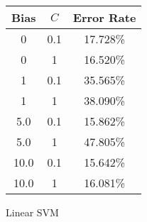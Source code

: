 \begin{center}
\begin{tabular}{|c|c|c|}
\hline
Bias & $C$ & Error Rate \\
\hline
0 & 0.1 & 17.728\% \\
\hline
0 & 1 & 16.520\% \\
\hline
1 & 0.1 & 35.565\% \\
\hline
1 & 1 & 38.090\% \\
\hline
5.0 & 0.1 & 15.862\% \\
\hline
5.0 & 1 & 47.805\% \\
\hline
10.0 & 0.1 & 15.642\% \\
\hline
10.0 & 1 & 16.081\% \\
\hline
\hline
\end{tabular}
\end{center}
\caption{Linear SVM}\label{tab:svm_linear_acctable}

